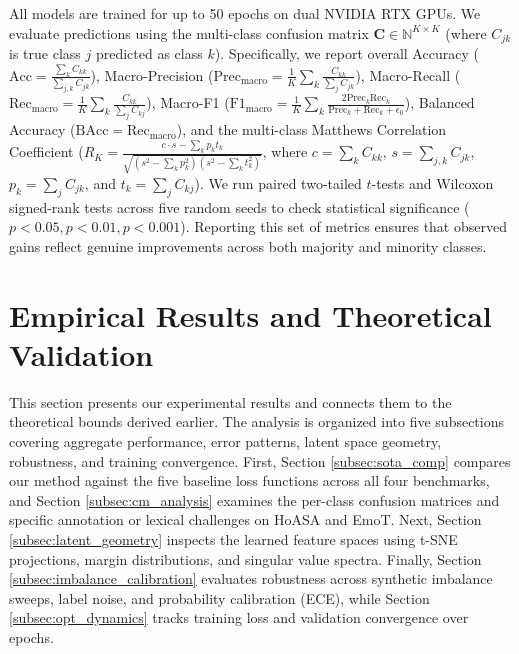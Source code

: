 \documentclass[10pt,journal,compsoc]{IEEEtran}
\begin{document}
All models are trained for up to 50 epochs on dual NVIDIA RTX GPUs. We evaluate predictions using the multi-class confusion matrix $\mathbf{C} \in \mathbb{N}^{K \times K}$ (where $C_{jk}$ is true class $j$ predicted as class $k$). Specifically, we report overall Accuracy ($\text{Acc} = \frac{\sum_k C_{kk}}{\sum_{j,k} C_{jk}}$), Macro-Precision ($\text{Prec}_{\text{macro}} = \frac{1}{K}\sum_k \frac{C_{kk}}{\sum_j C_{jk}}$), Macro-Recall ($\text{Rec}_{\text{macro}} = \frac{1}{K}\sum_k \frac{C_{kk}}{\sum_j C_{kj}}$), Macro-F1 ($\text{F1}_{\text{macro}} = \frac{1}{K}\sum_k \frac{2 \text{Prec}_k \text{Rec}_k}{\text{Prec}_k + \text{Rec}_k + \epsilon_0}$), Balanced Accuracy ($\text{BAcc} = \text{Rec}_{\text{macro}}$), and the multi-class Matthews Correlation Coefficient ($R_K = \frac{c \cdot s - \sum_k p_k t_k}{\sqrt{(s^2 - \sum_k p_k^2)(s^2 - \sum_k t_k^2)}}$, where $c = \sum_k C_{kk}$, $s = \sum_{j,k} C_{jk}$, $p_k = \sum_j C_{jk}$, and $t_k = \sum_j C_{kj}$). We run paired two-tailed $t$-tests and Wilcoxon signed-rank tests across five random seeds to check statistical significance ($p < 0.05, p < 0.01, p < 0.001$). Reporting this set of metrics ensures that observed gains reflect genuine improvements across both majority and minority classes.

\section{Empirical Results and Theoretical Validation}
\label{sec:results}

This section presents our experimental results and connects them to the theoretical bounds derived earlier. The analysis is organized into five subsections covering aggregate performance, error patterns, latent space geometry, robustness, and training convergence. First, Section \ref{subsec:sota_comp} compares our method against the five baseline loss functions across all four benchmarks, and Section \ref{subsec:cm_analysis} examines the per-class confusion matrices and specific annotation or lexical challenges on HoASA and EmoT. Next, Section \ref{subsec:latent_geometry} inspects the learned feature spaces using t-SNE projections, margin distributions, and singular value spectra. Finally, Section \ref{subsec:imbalance_calibration} evaluates robustness across synthetic imbalance sweeps, label noise, and probability calibration (ECE), while Section \ref{subsec:opt_dynamics} tracks training loss and validation convergence over epochs.
\end{document}

